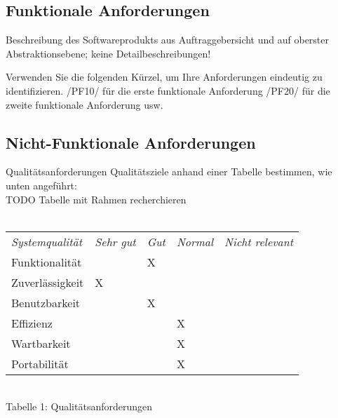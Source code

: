 %                                                                              
%                                                                              

\subsection{Funktionale Anforderungen}
Beschreibung des Softwareprodukts aus Auftraggebersicht und auf oberster Abstraktionsebene; keine Detailbeschreibungen!

Verwenden Sie die folgenden Kürzel, um Ihre Anforderungen eindeutig zu identifizieren.
/PF10/ für die erste funktionale Anforderung
/PF20/ für die zweite funktionale Anforderung
usw.

\subsection{Nicht-Funktionale Anforderungen}

Qualitätsanforderungen
Qualitätsziele anhand einer Tabelle bestimmen, wie unten angeführt:\\

         TODO Tabelle mit Rahmen recherchieren\\
         \ \\
        \begin{tabularx}{\textwidth}{ l l l l l }
            \emph{Systemqualität} & \emph{Sehr gut} & \emph{Gut}& \emph{Normal} & \emph{Nicht relevant}\\
            
			Funktionalität	& & X & &\\
			
			Zuverlässigkeit	& X & & &\\

			Benutzbarkeit	& & X & &\\

			Effizienz		& & & X &\\

			Wartbarkeit		& & & X &\\

			Portabilität		& & & X &\\

        \end{tabularx}
           
\ \\
Tabelle 1: Qualitätsanforderungen\\

